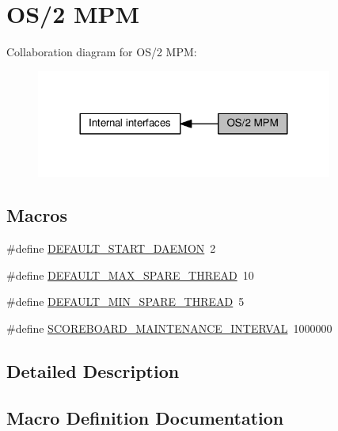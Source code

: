 \hypertarget{group__APACHE__MPM__OS2}{}\section{O\+S/2 M\+PM}
\label{group__APACHE__MPM__OS2}
Collaboration diagram for O\+S/2 M\+PM\+:
\nopagebreak
\begin{figure}[H]
\begin{center}
\leavevmode
\includegraphics[width=276pt]{group__APACHE__MPM__OS2}
\end{center}
\end{figure}
\subsection*{Macros}
\begin{DoxyCompactItemize}
\item 
\#define \hyperlink{group__APACHE__MPM__OS2_gac3950e57f9e8a7cfe6ff3fa67237e604}{D\+E\+F\+A\+U\+L\+T\+\_\+\+S\+T\+A\+R\+T\+\_\+\+D\+A\+E\+M\+ON}~2
\item 
\#define \hyperlink{group__APACHE__MPM__OS2_ga6ef53ae1f601e797405ac55cea2f145c}{D\+E\+F\+A\+U\+L\+T\+\_\+\+M\+A\+X\+\_\+\+S\+P\+A\+R\+E\+\_\+\+T\+H\+R\+E\+AD}~10
\item 
\#define \hyperlink{group__APACHE__MPM__OS2_ga90e7b4fd920c8faecead5a4f9afa080a}{D\+E\+F\+A\+U\+L\+T\+\_\+\+M\+I\+N\+\_\+\+S\+P\+A\+R\+E\+\_\+\+T\+H\+R\+E\+AD}~5
\item 
\#define \hyperlink{group__APACHE__MPM__OS2_gaff56963e5ad1fd30007bf7a53b721939}{S\+C\+O\+R\+E\+B\+O\+A\+R\+D\+\_\+\+M\+A\+I\+N\+T\+E\+N\+A\+N\+C\+E\+\_\+\+I\+N\+T\+E\+R\+V\+AL}~1000000
\end{DoxyCompactItemize}


\subsection{Detailed Description}


\subsection{Macro Definition Documentation}
